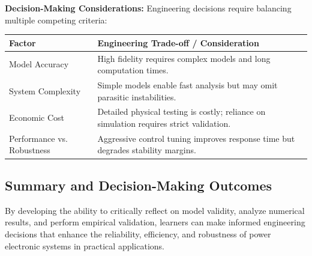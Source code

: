 \documentclass[12pt,a4paper]{article}
\begin{document}
\textbf{Decision-Making Considerations:}
Engineering decisions require balancing multiple competing criteria:
\begin{center}
\renewcommand{\arraystretch}{1.4}
\begin{tabularx}{\textwidth}{|>{\raggedright\arraybackslash}p{3.5cm}|X|}
\hline
\textbf{Factor} & \textbf{Engineering Trade-off / Consideration} \\
\hline
Model Accuracy & High fidelity requires complex models and long computation times. \\
\hline
System Complexity & Simple models enable fast analysis but may omit parasitic instabilities. \\
\hline
Economic Cost & Detailed physical testing is costly; reliance on simulation requires strict validation. \\
\hline
Performance vs. Robustness & Aggressive control tuning improves response time but degrades stability margins. \\
\hline
\end{tabularx}
\end{center}

\subsection{Summary and Decision-Making Outcomes}
By developing the ability to critically reflect on model validity, analyze numerical results, and perform empirical validation, learners can make informed engineering decisions that enhance the reliability, efficiency, and robustness of power electronic systems in practical applications.
\end{document}
